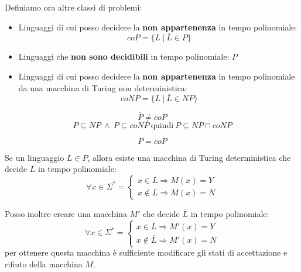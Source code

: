 Definiamo ora altre classi di problemi:
\begin{itemize}
    \item Linguaggi di cui posso decidere la \textbf{non appartenenza} in tempo polinomiale:
    \begin{equation}
        coP = \{L \ | \ \overline{L} \in P\}
    \end{equation}
    \item Linguaggi che \textbf{non sono decidibili} in tempo polinomiale: $\overline{P}$
    \item Linguaggi di cui posso decidere la \textbf{non appartenenza} in tempo polinomiale da una macchina di Turing non deterministica:
    \begin{equation}
        coNP = \{L \ | \ \overline{L} \in NP\}
    \end{equation}
\end{itemize}
\begin{nota}
    \begin{equation}
        \overline{P} \neq coP
    \end{equation}
    \begin{equation}
        P \subseteq NP \ \land \ P \subseteq coNP \ \text{quindi} \ P \subseteq NP \cap coNP
    \end{equation}
\end{nota}
\begin{teorema}
\begin{equation}
    P = coP
\end{equation}
\end{teorema}
\begin{dimostrazione}
    Se un linguaggio $L \in P$, allora esiste una macchina di Turing deterministica che decide $L$ in tempo polinomiale:
    \begin{equation}
        \forall x \in \Sigma^{\ast} = \begin{cases}
            x \in L \Rightarrow M(x) = Y \\
            x \not\in L \Rightarrow M(x) = N
        \end{cases}
    \end{equation}

    Posso inoltre creare una macchina $M'$ che decide $\overline{L}$ in tempo polinomiale: 
    \begin{equation}
        \forall x \in \Sigma^{\ast} = \begin{cases}
            x \in \overline{L} \Rightarrow M'(x) = Y \\
            x \not\in \overline{L} \Rightarrow M'(x) = N
        \end{cases}   
    \end{equation}
    per ottenere questa macchina è sufficiente modificare gli stati di accettazione e rifiuto della macchina $M$.
\end{dimostrazione}

